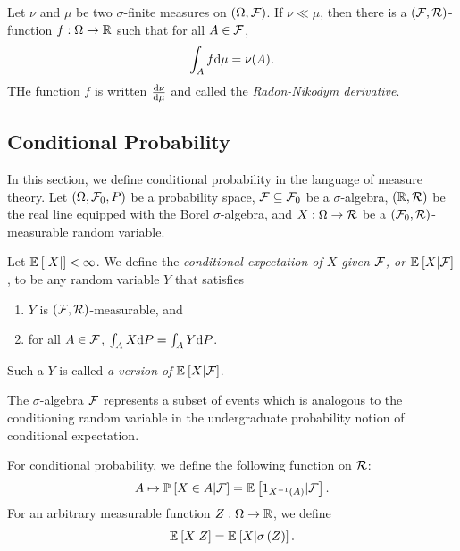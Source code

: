 \begin{thm}
    Let $\nu$ and $\mu$ be two $\sigma$-finite measures on $\left(\Omega, \mathcal{F}\right)$. If $\nu \ll \mu$, then there is a $\left(\mathcal{F}, \mathcal{R}\right)$-function $f: \Omega \rightarrow \mathbb{R}$ such that for all $A \in \mathcal{F}$,
    \begin{align*}
        \int_A f \text{d} \mu = \nu(A).
    \end{align*}
    THe function $f$ is written $\frac{\text{d} \nu}{\text{d} \mu}$ and called the {\it Radon-Nikodym derivative}.
\end{thm}

\subsection{Conditional Probability}
\label{sec:cond_prob}

In this section, we define conditional probability in the language of measure theory. Let $\left(\Omega, \mathcal{F}_0, P\right)$ be a probability space, $\mathcal{F} \subseteq \mathcal{F}_0$ be a $\sigma$-algebra, $\left(\mathbb{R}, \mathcal{R}\right)$ be the real line equipped with the Borel $\sigma$-algebra, and $X: \Omega \rightarrow \mathcal{R}$ be a $\left(\mathcal{F}_0, \mathcal{R}\right)$-measurable random variable.


\begin{defi}
    Let ${\mathbb E}_{}\left[\left|X\right|\right] < \infty$. We define the {\it conditional expectation of $X$ given $\mathcal{F}$, or ${\mathbb E}_{}\left[X | \mathcal{F}\right]$}, to be any random variable $Y$ that satisfies
    \begin{enumerate}[label=(\roman*)]
        \item $Y$ is $\left(\mathcal{F}, \mathcal{R}\right)$-measurable, and
        \item for all $A \in \mathcal{F}$, $\int_A X \text{d} P = \int_A Y \text{d} P$.
    \end{enumerate} 
    Such a $Y$ is called {\it a version of} ${\mathbb E}_{}\left[X | \mathcal{F}\right]$.
\end{defi}

The $\sigma$-algebra $\mathcal{F}$ represents a subset of events which is analogous to the conditioning random variable in the undergraduate probability notion of conditional expectation.

\begin{defi}
    For conditional probability, we define the following function on $\mathcal{R}$:
    \begin{align*}
        A \mapsto {\mathbb P}_{}\left[X \in A|\mathcal{F}\right] = {\mathbb E}_{}\left[1_{X^{-1}\left(A\right)} | \mathcal{F}\right].
    \end{align*}
    For an arbitrary measurable function $Z: \Omega \rightarrow \mathbb{R}$, we define
    \begin{align*}
        {\mathbb E}_{}\left[X | Z\right] = {\mathbb E}_{}\left[X | \sigma\left(Z\right)\right].
    \end{align*}
\end{defi}


